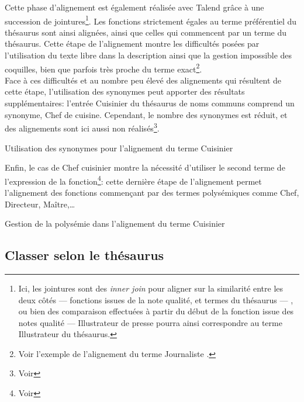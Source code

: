 Cette phase d'alignement est également réalisée avec Talend grâce à une succession de jointures\footnote{Ici, les jointures sont des \textit{inner join} pour aligner sur la similarité entre les deux côtés --- fonctions issues de la note qualité, et termes du thésaurus --- , ou bien des comparaison effectuées à partir du début de la fonction issue des notes qualité --- \og Illustrateur de presse\fg{} pourra ainsi correspondre au terme \og Illustrateur\fg{} du thésaurus.}. Les fonctions strictement égales au terme préférentiel du thésaurus sont ainsi alignées, ainsi que celles qui commencent par un terme du thésaurus. Cette étape de l'alignement montre les difficultés posées par l'utilisation du texte libre dans la description ainsi que la gestion impossible des coquilles, bien que parfois très proche du terme exact\footnote{Voir l'exemple de l'alignement du terme \og Journaliste\fg{} .}.\\

Face à ces difficultés et au nombre peu élevé des alignements qui résultent de cette étape, l'utilisation des synonymes peut apporter des résultats supplémentaires: l'entrée \og Cuisinier\fg{} du thésaurus de noms communs comprend un synonyme, \og Chef de cuisine\fg{}. Cependant, le nombre des synonymes est réduit, et des alignements sont ici aussi non réalisés\footnote{Voir }.
\begin{table}[!h]
	\centering
	\caption{Utilisation des synonymes pour l'alignement du terme \og Cuisinier\fg{}}
	\label{alignement_cuisinier}
\end{table}

Enfin, le cas de \og Chef cuisinier\fg{} montre la nécessité d'utiliser le second terme de l'expression de la fonction\footnote{Voir }: cette dernière étape de l'alignement permet l'alignement des fonctions commençant par des termes polysémiques comme \og Chef\fg{}, \og Directeur\fg{}, \og Maître\fg{},\dots
\begin{table}[!h]
	\centering
	\caption{Gestion de la polysémie dans l'alignement du terme \og Cuisinier\fg{}}
	\label{alignement_cuisinier_polysemie}
\end{table}

\subsection{\label{I-C-3-c}Classer selon le thésaurus}

